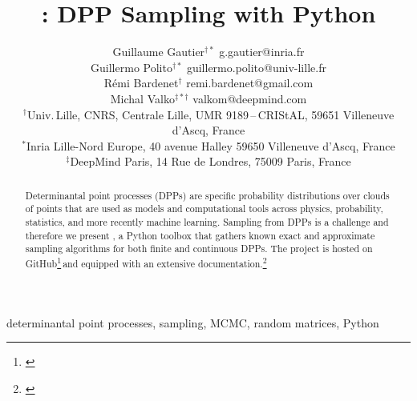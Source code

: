 \documentclass[twoside,11pt]{article}
\begin{document}
\title{
\vspace{-1.6em}
\DPPy: DPP Sampling with Python}

\author{\name Guillaume Gautier$^{\dagger*}$
            \email g.gautier@inria.fr\\
        \name Guillermo Polito$^{\dagger*}$
            \email guillermo.polito@univ-lille.fr\\
        \name R\'emi Bardenet$^\dagger$
            \email remi.bardenet@gmail.com\\
        \name Michal Valko$^{\ddag*\dagger}$
            \email valkom@deepmind.com\\
        \addr $^\dagger$Univ.\,Lille, CNRS, Centrale Lille, UMR 9189\,--\,CRIStAL,  59651 Villeneuve d'Ascq, France\\
        \addr $^*$Inria Lille-Nord Europe, 40 avenue Halley 59650 Villeneuve    d'Ascq, France\\
        \addr $^\ddag$DeepMind Paris, 14 Rue de Londres, 75009  Paris, France
        \vspace{-1.2em}
}


\maketitle

\setcounter{footnote}{3}
\begin{abstract}%
    Determinantal point processes (DPPs) are specific probability distributions over clouds of points that are used as models and computational tools across physics, probability, statistics, and more recently machine learning.
    Sampling from DPPs is a challenge and therefore we present \DPPy, a Python toolbox that gathers known exact and approximate sampling algorithms for both finite and continuous DPPs.
    The project is hosted on GitHub\!\footnote{\label{fn:github}\footGitHubDPPy}\,and equipped with an extensive documentation.\!\footnote{\label{fn:docs}\footReadTheDocs}
\end{abstract}

\begin{keywords}%
    determinantal point processes,
    sampling,
    MCMC,
    random matrices,
    Python
\end{keywords}
\end{document}
